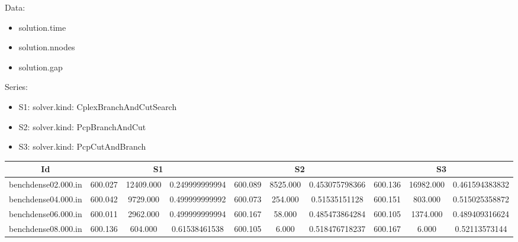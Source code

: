 \documentclass[landscape, 12pt]{report}
\begin{document}
\tiny


Data:
\begin{itemize}
\item solution.time
\item solution.nnodes
\item solution.gap
\end{itemize}
Series:
\begin{itemize}
\item S1: solver.kind: CplexBranchAndCutSearch
\item S2: solver.kind: PcpBranchAndCut
\item S3: solver.kind: PcpCutAndBranch
\end{itemize}
\begin{tabular}{|c|ccc|ccc|ccc|}
\hline
\multicolumn{1}{|c|}{Id} & \multicolumn{3}{|c|}{S1} & \multicolumn{3}{|c|}{S2} & \multicolumn{3}{|c|}{S3}
\\
\hline
benchdense02.000.in & 600.027 & 12409.000 & 0.249999999994 & 600.089 & 8525.000 & 0.453075798366 & 600.136 & 16982.000 & 0.461594383832
\\
benchdense04.000.in & 600.042 & 9729.000 & 0.499999999992 & 600.073 & 254.000 & 0.51535151128 & 600.151 & 803.000 & 0.515025358872
\\
benchdense06.000.in & 600.011 & 2962.000 & 0.499999999994 & 600.167 & 58.000 & 0.485473864284 & 600.105 & 1374.000 & 0.489409316624
\\
benchdense08.000.in & 600.136 & 604.000 & 0.61538461538 & 600.105 & 6.000 & 0.518476718237 & 600.167 & 6.000 & 0.52113573144
\\
\hline 
 \end{tabular}
\end{document}
